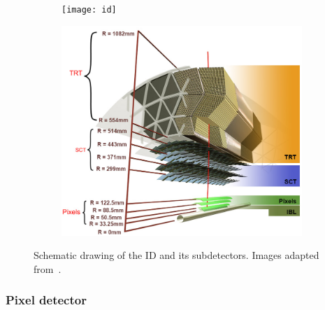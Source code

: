 \begin{figure}
	\centering
	\begin{subfigure}[b]{0.49\linewidth}
		\centering\texttt{[image: id]}
	\end{subfigure}\hfill
	\begin{subfigure}[b]{0.45\linewidth}
		\centering\includegraphics[width=\textwidth]{ibl}
	\end{subfigure}%
	\caption{Schematic drawing of the ID and its subdetectors. Images adapted from~\cite{Pequenao:1095926, Potamianos:2209070}.}\label{fig:ID_schematic}
\end{figure}

\subsubsection{Pixel detector}

